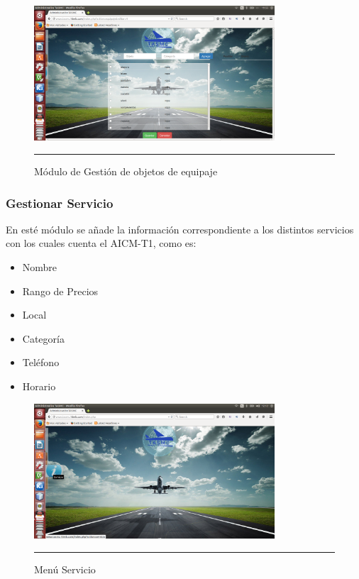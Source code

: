 \begin{figure}[h!]
	\centering
		\includegraphics[width=0.8\textwidth]{Figuras/objetosEquipaje.png}
		\rule{35em}{0.5pt}
	\caption[Módulo de Gestión de objetos de equipaje]{Módulo de Gestión de objetos de equipaje}
	\label{fig:moduloObjetos}
\end{figure}
\clearpage

\subsubsection{Gestionar Servicio}
En esté módulo se añade la información correspondiente a los distintos servicios con los cuales cuenta el AICM-T1, como es: 
\begin{itemize}
 \item Nombre
 \item Rango de Precios
 \item Local
 \item Categoría
 \item Teléfono
 \item Horario
\end{itemize}

\begin{figure}[h!]
	\centering
		\includegraphics[width=0.8\textwidth]{Figuras/indexServicio.png}
		\rule{35em}{0.5pt}
	\caption[Menú Servicio]{Menú Servicio}
	\label{fig:menuServicio}
\end{figure}

